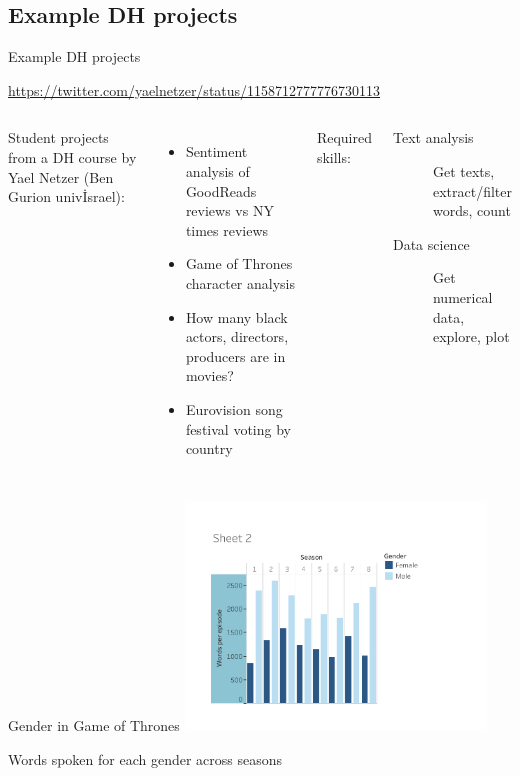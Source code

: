 \documentclass[aspectratio=169,usenames,dvipsnames]{beamer}
\begin{document}
\subsection{Example DH projects}
\begin{frame}{Example DH projects}
\begin{reference}
\url{https://twitter.com/yaelnetzer/status/1158712777776730113}
\end{reference}
    \begin{columns}
            Student projects from a DH course by Yael Netzer (Ben Gurion univ\. Israel):
            \begin{itemize}
                \item Sentiment analysis of GoodReads reviews vs NY times reviews
                \item Game of Thrones character analysis
                \item How many black actors, directors,
                    producers are in movies?
                \item Eurovision song festival voting by country
            \end{itemize}
            Required skills:
            \begin{description}
                \item[Text analysis] Get texts, extract/filter words, count
                \item[Data science] Get numerical data, explore, plot
            \end{description}
    \end{columns}
\end{frame}

\begin{frame}{Gender in Game of Thrones}\centering
    \includegraphics[width=0.6\textwidth]{fig/got}

    Words spoken for each gender across seasons
\end{frame}
\end{document}
